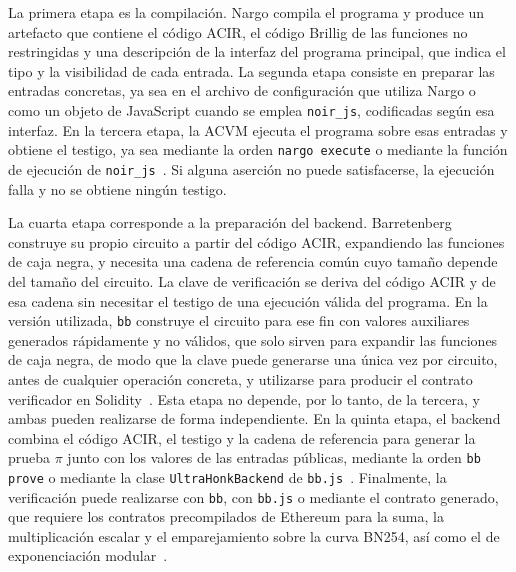 La primera etapa es la compilación. Nargo compila el programa y produce un artefacto que
contiene el código ACIR, el código Brillig de las funciones no restringidas y una descripción de
la interfaz del programa principal, que indica el tipo y la visibilidad de cada entrada. La
segunda etapa consiste en preparar las entradas concretas, ya sea en el archivo de configuración
que utiliza Nargo o como un objeto de JavaScript cuando se emplea \texttt{noir\_js}, codificadas
según esa interfaz. En la tercera etapa, la ACVM ejecuta el programa sobre esas entradas y obtiene
el testigo, ya sea mediante la orden \lstinline|nargo execute| o mediante la función de ejecución
de \texttt{noir\_js}~\cite{noirdocsbeta, noirjsnpm}. Si alguna aserción no puede satisfacerse, la
ejecución falla y no se obtiene ningún testigo.

La cuarta etapa corresponde a la preparación del backend. Barretenberg construye su propio
circuito a partir del código ACIR, expandiendo las funciones de caja negra, y necesita una cadena
de referencia común cuyo tamaño depende del tamaño del circuito. La clave de verificación se
deriva del código ACIR y de esa cadena sin necesitar el testigo de una ejecución válida del
programa. En la versión utilizada, \texttt{bb} construye el circuito para ese fin con valores
auxiliares generados rápidamente y no válidos, que solo sirven para expandir las funciones de caja
negra, de modo que la clave puede generarse una única vez por circuito, antes de cualquier
operación concreta, y utilizarse para producir el contrato verificador en
Solidity~\cite{barretenbergsrc}. Esta etapa no depende, por lo tanto, de
la tercera, y ambas pueden realizarse de forma independiente. En la quinta etapa, el backend
combina el código ACIR, el testigo y la cadena de referencia para generar la prueba $\pi$ junto
con los valores de las entradas públicas, mediante la orden \lstinline|bb prove| o mediante la
clase \texttt{UltraHonkBackend} de \texttt{bb.js}~\cite{barretenbergsrc, bbjsnpm}. Finalmente, la
verificación puede realizarse con \texttt{bb}, con \texttt{bb.js} o mediante el contrato generado,
que requiere los contratos precompilados de Ethereum para la suma, la multiplicación escalar y el
emparejamiento sobre la curva BN254, así como el de exponenciación modular~\cite{barretenbergsrc}.

